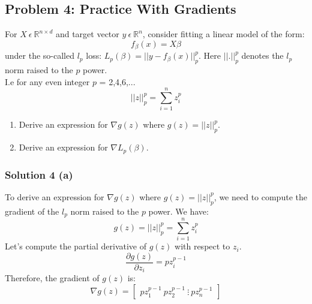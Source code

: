 \documentclass{assignment}
\begin{document}
\begin{problem}
\section{Problem 4: Practice With Gradients}

\noindent For $X\ \epsilon\ \mathbb{R}^{n\times d}$ and target vector $y\ \epsilon\ \mathbb{R}^n$, consider fitting a linear model of the form:
\begin{equation}
    f_\beta(x) = X\beta
\end{equation}
under the so-called $l_p$ loss: $L_p(\beta) = || y - f_\beta(x)||^p_p$. Here $||.||^p_p$ denotes the $l_p$ norm raised to the $p$ power.
\\
I.e for any even integer $p$ = 2,4,6,...
\begin{equation}
    ||z||_p^p = \sum_{i=1}^n z_i^p
\end{equation}
\begin{enumerate}[label=(\alph*)]
    \item Derive an expression for $\nabla g(z)$ where $g(z) = ||z||_p^p$.
    \item Derive an expression for $\nabla L_p(\beta)$.
\end{enumerate}

\subsubsection*{Solution 4 (a)}
\noindent To derive an expression for $\nabla g(z)$ where $g(z) = ||z||_p^p$, we need to compute the gradient of the $l_p$ norm raised to the $p$ power. We have: \\
\begin{equation}
    g(z) = ||z||_p^p = \sum_{i=1}^nz_i^p
\end{equation}
Let's compute the partial derivative of $g(z)$ with respect to $z_i$.
\begin{equation}
    \frac{\partial g(z)}{\partial z_i} = pz_i^{p-1}
\end{equation}
Therefore, the gradient of $g(z)$ is:
\begin{equation}
\nabla g(z) = \begin{bmatrix} p z_1^{p-1} \ p z_2^{p-1} \ \vdots \ p z_n^{p-1} \end{bmatrix}
\end{equation}


\end{problem}
\end{document}

